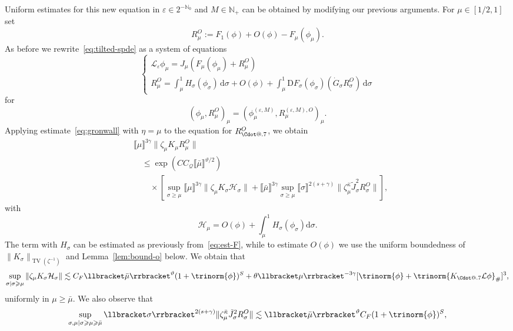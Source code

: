 \documentclass{article}
\makeatletter
\numberwithin{equation}{section}
\newcommand{\assign}{:=}
\newcommand{\mathD}{\mathrm{D}}
\newcommand{\mathd}{\mathrm{d}}
\newcommand*\Cdot{{\mathpalette\Cdot@{.7}}}
\newcommand*\Cdot@[2]{\mathbin{\vcenter{\hbox{\scalebox{#2}{\hspace{0.1mm}$\m@th#1\bullet$\hspace{0.1mm}}}}}}
\theoremstyle{plain}
\theoremstyle{definition}
\makeatother
\begin{document}
Uniform estimates for this new equation in $\varepsilon \in 2^{-\mathbb{N}_0}$
and $M \in \mathbb{N}_+$ can be obtained by modifying our previous arguments.
For $\mu \in [1/2,1]$ set
\[ R^O_{\mu} \assign F_1 (\phi) + O (\phi) - F_{\mu} (\phi_{\mu}) . \]
As before we rewrite~\eqref{eq:tilted-spde} as a system of equations
\begin{equation}
  \left\{\begin{array}{l}
    \mathcal{L}_{\varepsilon} \phi _{\mu} = J_{\mu} (F _{\mu} (\phi _{\mu}) +
    R^O_{\mu})\\
    R^O_{\mu} = \int_{\mu}^1 H_{\sigma}  (\phi _{\sigma})\,\mathd \sigma + O
    (\phi ) + \int_{\mu}^1 \mathD F _{\sigma} (\phi _{\sigma}) 
    (\dot{G}_{\sigma}  R^O_{\sigma})\,\mathd \sigma
  \end{array}\right. \label{eq:rem-O}
\end{equation}
for
\[ (\phi _{\mu}, R^O_{\mu})_{\mu} = (\phi_{\mu}^{(\varepsilon, M)},
   R^{(\varepsilon, M), O}_{\mu})_{\mu} . \]
Applying estimate~\eqref{eq:gronwall} with $\eta = \mu$ to the equation for
$R_{\Cdot}^O$, we obtain
\begin{align*}
   &\llbracket \mu \rrbracket^{3 \gamma}
   \| \zeta_{\mu} K_{\mu} R^O_{\mu} \|\\
   &\quad \leqslant \exp (C C_{\mathcal{Q}} \llbracket \bar{\mu}
   \rrbracket^{\vartheta / 2})\\
   &\qquad \times
   \left[\sup_{\sigma \geqslant \mu}  \llbracket \mu
   \rrbracket^{3 \gamma}  \| \zeta_{\mu} K_{\sigma} \mathcal{H}_{\sigma} \|
   + \llbracket \bar{\mu} \rrbracket^{3 \gamma} \sup_{\sigma \geqslant \mu}
   \llbracket \sigma \rrbracket^{2 (s + \gamma)}
   \| \zeta_{\mu}^{\bar{\kappa}} \tilde{J}_{\sigma}^2 R_{\sigma}^O \|\right],
\end{align*}
with
\[ \mathcal{H}_{\mu} = O (\phi) + \int_{\mu}^1 H_{\sigma} (\phi_{\sigma})
   \mathd \sigma . \]
The term with $H_{\sigma}$ can be estimated as previously
from~\eqref{eq:est-F}, while to estimate $O (\phi)$ we use the uniform
boundedness of $\| K_{\sigma} \|_{\operatorname{TV} (\zeta^{- 1})}$ and
Lemma~\ref{lem:bound-o} below. We obtain that
\[ \sup_{\sigma | \sigma \geqslant \mu}  \| \zeta_{\mu} K_{\sigma}
   \mathcal{H}_{\sigma} \| \lesssim C_F  \llbracket \bar{\mu}
   \rrbracket^{\vartheta}  (1 + \trinorm{ \phi })^S + \theta
   \llbracket \mu \rrbracket^{- 3 \gamma} [\trinorm{ \phi } +
   \trinorm{ K_{\Cdot} \mathcal{L} \phi }_{\#}]^3, \]
uniformly in $\mu \geqslant \bar{\mu} .$ We also observe that
\[ \sup_{\sigma, \mu | \sigma \geqslant \mu \geqslant \bar{\mu}} \llbracket
   \sigma \rrbracket^{2 (s + \gamma)}  \| \zeta_{\mu}^{\bar{\kappa}}
   \tilde{J}_{\sigma}^2 R_{\sigma}^O \| \lesssim \llbracket \bar{\mu}
   \rrbracket^{\vartheta} C_F (1 + \trinorm{ \phi })^S, \]
\end{document}
